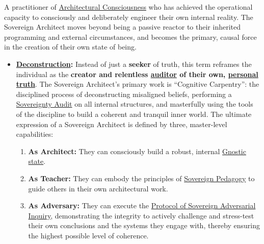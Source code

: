 \item[\hypertarget{gloss:sovereign_architect}{Sovereign Architect}]
    A practitioner of \hyperlink{gloss:architectural_consciousness}{Architectural Consciousness} who has achieved the operational capacity to consciously and deliberately engineer their own internal reality. The Sovereign Architect moves beyond being a passive reactor to their inherited programming and external circumstances, and becomes the primary, causal force in the creation of their own state of being.
    \begin{itemize}
        \item \textbf{\hyperlink{gloss:deconstruction}{Deconstruction}:} Instead of just a \textbf{seeker} of truth, this term reframes the individual as the \textbf{creator and relentless \underline{auditor} of their own, \underline{personal truth}}. The Sovereign Architect's primary work is ``Cognitive Carpentry'': the disciplined process of deconstructing misaligned beliefs, performing a \hyperlink{gloss:sovereignty_audit}{Sovereignty Audit} on all internal structures, and masterfully using the tools of the discipline to build a coherent and tranquil inner world. The ultimate expression of a Sovereign Architect is defined by three, master-level capabilities:
        \begin{enumerate}
            \item \textbf{As Architect:} They can consciously build a robust, internal \hyperlink{gloss:gnostic_state}{Gnostic state}.
            \item \textbf{As Teacher:} They can embody the principles of \hyperlink{gloss:sovereign_pedagogy}{Sovereign Pedagogy} to guide others in their own architectural work.
            \item \textbf{As Adversary:} They can execute the \hyperlink{gloss:protocol_of_sovereign_adversarial_inquiry}{Protocol of Sovereign Adversarial Inquiry}, demonstrating the integrity to actively challenge and stress-test their own conclusions and the systems they engage with, thereby ensuring the highest possible level of coherence.
        \end{enumerate}
    \end{itemize}

